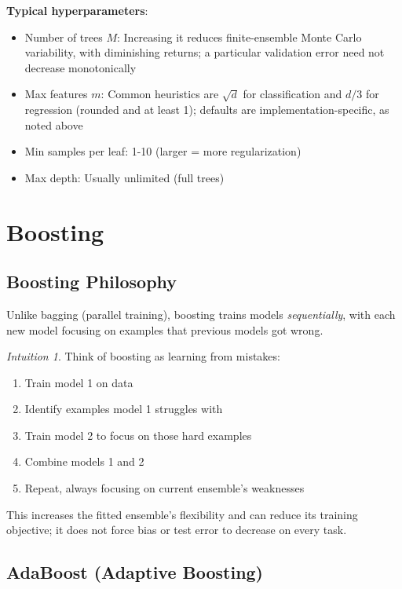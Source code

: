 \documentclass[11pt,twoside]{article}
\numberwithin{equation}{section}
\theoremstyle{plain}
\theoremstyle{definition}
\theoremstyle{remark}
\newtheorem{intuition}[theorem]{Intuition}
\newenvironment{keyidea}{
  \begin{tcolorbox}[colback=yellow!5!white,
                    colframe=yellow!50!black,
                    title=Key Idea,
                    breakable,
                    enhanced,
                    sharp corners,
                    boxrule=0.8pt,
                    left=6pt, right=6pt, top=6pt, bottom=6pt]
}{
  \end{tcolorbox}
}
\begin{document}
\begin{keyidea}
\textbf{Typical hyperparameters}:
\begin{itemize}
\item Number of trees $M$: Increasing it reduces finite-ensemble Monte Carlo variability, with diminishing returns; a particular validation error need not decrease monotonically
\item Max features $m$: Common heuristics are $\sqrt d$ for classification and $d/3$ for regression (rounded and at least 1); defaults are implementation-specific, as noted above
\item Min samples per leaf: 1-10 (larger = more regularization)
\item Max depth: Usually unlimited (full trees)
\end{itemize}
\end{keyidea}

\section{Boosting}
\label{sec:boosting}

\subsection{Boosting Philosophy}

Unlike bagging (parallel training), boosting trains models \emph{sequentially}, with each new model focusing on examples that previous models got wrong.

\begin{intuition}
Think of boosting as learning from mistakes:
\begin{enumerate}
\item Train model 1 on data
\item Identify examples model 1 struggles with
\item Train model 2 to focus on those hard examples
\item Combine models 1 and 2
\item Repeat, always focusing on current ensemble's weaknesses
\end{enumerate}

This increases the fitted ensemble's flexibility and can reduce its training objective; it does not force bias or test error to decrease on every task.
\end{intuition}

\subsection{AdaBoost (Adaptive Boosting)}
\end{document}
